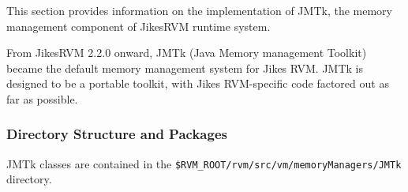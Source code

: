 
\newcommand{\vmInterfacePackageURL}{{\RVMJavadocURL}/memoryManagers/vmInterface/package-frame.html}
\newcommand{\JMTkPackageURL}{{\RVMJavadocURL}/memoryManagers/JMTk/package-frame.html}
\newcommand{\BaseFreeListURL}{{\RVMJavadocURL}/BaseFreeList.html}
\newcommand{\MarkSweepCollectorURL}{{\RVMJavadocURL}/MarkSweepCollector.html}
\newcommand{\BumpPointerURL}{{\RVMJavadocURL}/BumpPointer.html}
\newcommand{\SharedQueueURL}{{\RVMJavadocURL}/SharedQueue.html}
\newcommand{\LocalSSBURL}{{\RVMJavadocURL}/LocalSSB.html}
\newcommand{\BasePlanURL}{{\RVMJavadocURL}/BasePlan.html}
\newcommand{\StopTheWorldGCURL}{{\RVMJavadocURL}/StopTheWorldGC.html}
\newcommand{\GenerationalURL}{{\RVMJavadocURL}/Generational.html}
\newcommand{\VMResourceURL}{{\RVMJavadocURL}/VMResource.html}
\newcommand{\CopyURL}{{\RVMJavadocURL}/Copy.html}
\newcommand{\AddressQueueURL}{{\RVMJavadocURL}/AddressQueue.html}
\newcommand{\MemoryResourceURL}{{\RVMJavadocURL}/MemoryResource.html}
\newcommand{\MonotoneVMResourceURL}{{\RVMJavadocURL}/MonotoneVMResource.html}
\newcommand{\FreeListVMResourceURL}{{\RVMJavadocURL}/FreeListVMResource.html}
\newcommand{\LazyMmapperURL}{{\RVMJavadocURL}/LazyMmapper.html}
\newcommand{\RawPageAllocatorURL}{{\RVMJavadocURL}/RawPageAllocator.html}
\newcommand{\VMInterfaceURL}{{\RVMJavadocURL}/VM\_Interface.html}
\newcommand{\ScanObjectURL}{{\RVMJavadocURL}/ScanObject.html}
\newcommand{\ScanStaticsURL}{{\RVMJavadocURL}/ScanStatics.html}
\newcommand{\ScanThreadURL}{{\RVMJavadocURL}/ScanThread.html}
\newcommand{\VMGCMapIteratorURL}{{\RVMJavadocURL}/VM\_GCMapIterator.html}
\newcommand{\VMCollectorThreadURL}{{\RVMJavadocURL}/VM\_CollectorThread.html}
\newcommand{\VMHandshakeURL}{{\RVMJavadocURL}/VM\_Handshake.html}

This section provides information on the implementation of JMTk, the
memory management component of Jikes\trademark RVM runtime system.

From Jikes\trademark RVM 2.2.0 onward, JMTk (Java Memory management
Toolkit) became the default memory management system for Jikes RVM.
JMTk is designed to be a portable toolkit, with Jikes\trademark
RVM-specific code factored out as far as possible.

\subsubsection{Directory Structure and Packages} \label{sssec:directories}

JMTk classes are contained in the
\texttt{\$RVM\_ROOT/rvm/src/vm/memoryManagers/JMTk} directory.

